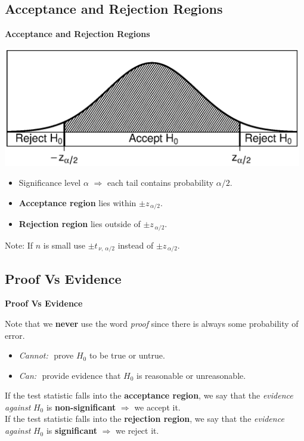 \documentclass[compress]{beamer}        %
\makeatletter
\newcommand{\tcb}{\textcolor{beamer@blendedblue}}
\makeatother
\begin{document}
\subsection{Acceptance and Rejection Regions}
\begin{frame}{\bf \tcb{Acceptance and Rejection Regions\\[-1.1cm]}}
\begin{center}
\includegraphics[width=0.98\textwidth, trim = 1.5cm 1.6cm 0.7cm 1.5cm, clip]{AcceptRegion}
\end{center}
\begin{itemize}\itemsep0.2cm
\item Significance level $\alpha$ $\Rightarrow$ each tail contains probability $\alpha/2$.
\item {\bf Acceptance region} lies within $\pm z_{\,\alpha/2}$.
\item {\bf Rejection region} lies outside of $\pm z_{\,\alpha/2}$.\\[0.3cm]
\end{itemize}
Note: If $n$ is small use  $\pm t_{\,\nu,\,\alpha/2}$ instead of $\pm z_{\,\alpha/2}$.
\end{frame}



\subsection{Proof Vs Evidence}
\begin{frame}{\bf \tcb{Proof Vs Evidence}}

Note that we {\bf never} use the word \emph{proof} since there is always some probability of error.\\[0.3cm]
\begin{itemize}\itemsep0.5cm
\item \emph{Cannot:}\,\, prove $H_0$ to be true or untrue.
\item \emph{Can:}\,\, provide evidence that $H_0$ is reasonable or unreasonable.\\[0.9cm]
\end{itemize}


If the test statistic falls into the {\bf acceptance region}, we say that the \emph{evidence against} $H_0$ is {\bf non-significant} $\Rightarrow$ we accept it.\\[0.6cm]


If the test statistic falls into the {\bf rejection region}, we say that the \emph{evidence against} $H_0$ is {\bf significant} $\Rightarrow$ we reject it.

\end{frame}
\end{document}
